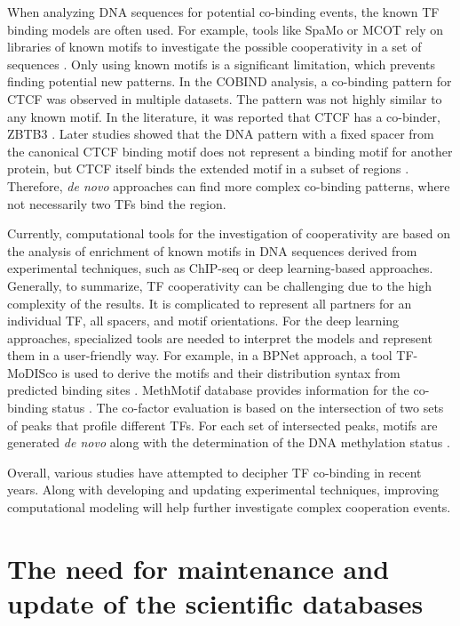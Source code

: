     When analyzing DNA sequences for potential co-binding events, the known TF binding models are often used. For example, tools like SpaMo or MCOT rely on libraries of known motifs to investigate the possible cooperativity in a set of sequences \cite{whitington2011inferring,levitsky2019single}. Only using known motifs is a significant limitation, which prevents finding potential new patterns. In the COBIND analysis, a co-binding pattern for CTCF was observed in multiple datasets. The pattern was not highly similar to any known motif. In the literature, it was reported that CTCF has a co-binder, ZBTB3 \cite{wang2020dynamic,boyle2011high}. Later studies showed that the DNA pattern with a fixed spacer from the canonical CTCF binding motif does not represent a binding motif for another protein, but CTCF itself binds the extended motif in a subset of regions \cite{soochit2021ctcf}. Therefore, \textit{de novo} approaches can find more complex co-binding patterns, where not necessarily two TFs bind the region.

    Currently, computational tools for the investigation of cooperativity are based on the analysis of enrichment of known motifs in DNA sequences derived from experimental techniques, such as ChIP-seq or deep learning-based approaches. Generally, to summarize, TF cooperativity can be challenging due to the high complexity of the results. It is complicated to represent all partners for an individual TF, all spacers, and motif orientations. For the deep learning approaches, specialized tools are needed to interpret the models and represent them in a user-friendly way. For example, in a BPNet approach, a tool TF-MoDISco is used to derive the motifs and their distribution syntax from predicted binding sites \cite{avsec2021base,shrikumar2018technical}. MethMotif database provides information for the co-binding status \cite{dyer2024methmotif}. The co-factor evaluation is based on the intersection of two sets of peaks that profile different TFs. For each set of intersected peaks, motifs are generated \textit{de novo} along with the determination of the DNA methylation status \cite{dyer2024methmotif,lin2020tfregulomer}.

    Overall, various studies have attempted to decipher TF co-binding in recent years. Along with developing and updating experimental techniques, improving computational modeling will help further investigate complex cooperation events. 

    \section{The need for maintenance and update of the scientific databases}

